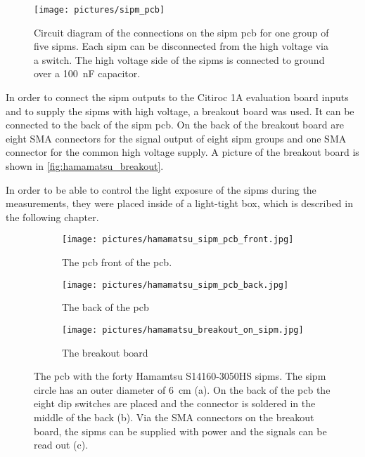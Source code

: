 \begin{figure}
	\centering
	\texttt{[image: pictures/sipm\_pcb]}
	\caption[Circuit diagram of the connections on the \ac{sipm} \ac{pcb}]{Circuit diagram of the connections on the \ac{sipm} \ac{pcb} for one group of five \acp{sipm}. Each \ac{sipm} can be disconnected from the high voltage via a switch. The high voltage side of the \acp{sipm} is connected to ground over a \SI{100}{\nano\farad} capacitor.}
	\label{fig:hamamatsu_pcb_circuit}
\end{figure}

In order to connect the \ac{sipm} outputs to the Citiroc 1A evaluation board inputs and to supply the \ac{sipm}s with high voltage, a breakout board was used.
It can be connected to the back of the \ac{sipm} \ac{pcb}.
On the back of the breakout board are eight SMA connectors for the signal output of eight \ac{sipm} groups and one SMA connector for the common high voltage supply.
A picture of the breakout board is shown in \autoref{fig:hamamatsu_breakout}.



In order to be able to control the light exposure of the \ac{sipm}s during the measurements, they were placed inside of a light-tight box, which is described in the following chapter.

\begin{figure}
    \centering
    \begin{subfigure}[t]{0.33\textwidth}
        \centering
        \texttt{[image: pictures/hamamatsu\_sipm\_pcb\_front.jpg]}
        \caption{The \ac{pcb} front of the \ac{pcb}.}
        \label{fig:hamamatsu_pcb_front}
    \end{subfigure}%
    \begin{subfigure}[t]{0.33\textwidth}
        \centering
        \texttt{[image: pictures/hamamatsu\_sipm\_pcb\_back.jpg]}
        \caption{The back of the \ac{pcb}}
        \label{fig:hamamatsu_pcb_back}
    \end{subfigure}%
    \begin{subfigure}[t]{0.33\textwidth}
        \centering
        \texttt{[image: pictures/hamamatsu\_breakout\_on\_sipm.jpg]}
        \caption{The breakout board}
        \label{fig:hamamatsu_breakout}
    \end{subfigure}
	\caption[Hamamatsu \ac{sipm} array and the breakout board.]{The \ac{pcb} with the forty Hamamtsu S14160-3050HS \ac{sipm}s. 
	The \ac{sipm} circle has an outer diameter of \SI{6}{\centi\meter} (a). 
	On the back of the \ac{pcb} the eight dip switches are placed and the connector is soldered in the middle of the back (b). 
	Via the SMA connectors on the breakout board, the \ac{sipm}s can be supplied with power and the signals can be read out (c).}
\end{figure}





